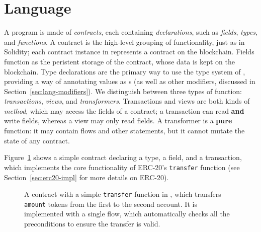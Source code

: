 \documentclass[dvipsnames, usenames, sigconf]{acmart}
\begin{document}
\section{Language}\label{sec:lang}
A \langName program is made of \emph{contracts}, each containing \emph{declarations}, such as \emph{fields}, \emph{types}, and \emph{functions}.
A contract is the high-level grouping of functionality, just as in Solidity; each contract instance in \langName represents a contract on the blockchain.
Fields function as the peristent storage of the contract, whose data is kept on the blockchain.
Type declarations are the primary way to use the type system of \langName, providing a way of annotating values as \assetTxt{}s (as well as other modifiers, discussed in Section~\ref{sec:lang-modifiers}).
We distinguish between three types of function: \emph{transactions}, \emph{views}, and \emph{transformers}.
Transactions and views are both kinds of \emph{method}, which may access the fields of a contract; a transaction can read \textbf{and} write fields, whereas a view may only read fields.
A transformer is a \textbf{pure} function: it may contain flows and other statements, but it cannot mutate the state of any contract.

Figure~\ref{fig:erc20-transfer-flow} shows a simple contract declaring a type, a field, and a transaction, which implements the core functionality of ERC-20's \lstinline{transfer} function (see Section~\ref{sec:erc20-impl} for more details on ERC-20).
\begin{figure}[h]
    \centering
    
    \caption{A contract with a simple \lstinline{transfer} function in \langName, which transfers \lstinline{amount} tokens from the first to the second account.
It is implemented with a single flow, which automatically checks all the preconditions to ensure the transfer is valid.}
    \label{fig:erc20-transfer-flow}
\end{figure}
%         
%         
\end{document}
